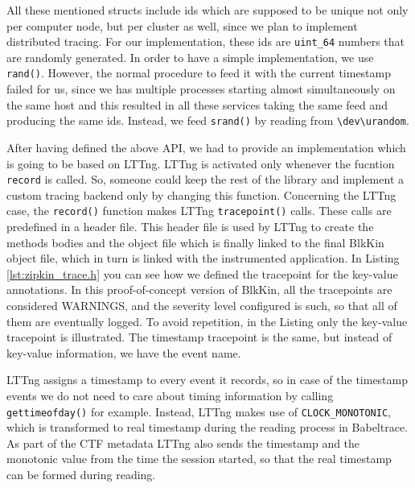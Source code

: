 
All these mentioned structs include ids which are supposed to be unique not only
per computer node, but per cluster as well, since we plan to implement
distributed tracing. For our implementation, these ids are \texttt{uint\_64}
numbers that are randomly generated. In order to have a simple implementation,
we use \texttt{rand()}. However, the normal procedure to feed it with the
current timestamp failed for us, since we has multiple processes starting almost
simultaneously on the same host and this resulted in all these services taking
the same feed and producing the same ids. Instead, we feed \texttt{srand()} by
reading from \texttt{\textbackslash dev\textbackslash urandom}.

After having defined the above API, we had to provide an implementation which is
going to be based on LTTng. LTTng is activated only whenever the fucntion
\texttt{record} is called. So, someone could keep the rest of the library and
implement a custom tracing backend only by changing this function. Concerning
the LTTng case, the \texttt{record()} function makes LTTng \texttt{tracepoint()}
calls. These calls are predefined in a header file. This header file is used by
LTTng to create the methods bodies and the object file which is finally linked
to the final BlkKin object file, which in turn is linked with the instrumented
application. In Listing \ref{lst:zipkin_trace.h} you can see how we defined the
tracepoint for the key-value annotations. In this proof-of-concept version
of BlkKin, all the tracepoints are considered WARNINGS, and the severity level
configured is such, so that all of them are eventually logged. To avoid
repetition, in the Listing only the key-value tracepoint is illustrated. The
timestamp tracepoint is the same, but instead of key-value information, we have
the event name.


LTTng assigns a timestamp to every event it records, so in case of the
timestamp events we do not need to care about timing information by calling
\texttt{gettimeofday()} for example. Instead, LTTng makes use of
\texttt{CLOCK\_MONOTONIC}, which is transformed to real timestamp during the
reading process in Babeltrace. As part of the CTF metadata LTTng also sends the
timestamp and the monotonic value from the time the session started, so that
the real timestamp can be formed during reading.

